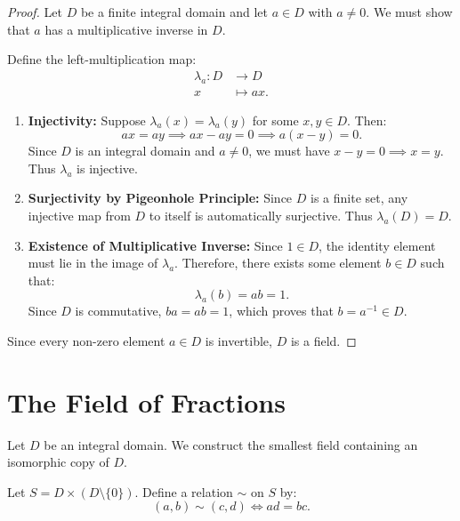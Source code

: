\begin{proof}
Let $D$ be a finite integral domain and let $a \in D$ with $a \ne 0$.
We must show that $a$ has a multiplicative inverse in $D$.

Define the left-multiplication map:
\begin{align*}
\lambda_a: D &\longrightarrow D \\
x &\longmapsto ax.
\end{align*}
\begin{enumerate}[label=\arabic*., leftmargin=*]
    \item \textbf{Injectivity:}
    Suppose $\lambda_a(x) = \lambda_a(y)$ for some $x, y \in D$. Then:
    \begin{equation*}
    ax = ay \implies ax - ay = 0 \implies a(x - y) = 0.
    \end{equation*}
    Since $D$ is an integral domain and $a \ne 0$, we must have $x - y = 0 \implies x = y$.
    Thus $\lambda_a$ is injective.

    \item \textbf{Surjectivity by Pigeonhole Principle:}
    Since $D$ is a finite set, any injective map from $D$ to itself is automatically surjective.
    Thus $\lambda_a(D) = D$.

    \item \textbf{Existence of Multiplicative Inverse:}
    Since $1 \in D$, the identity element must lie in the image of $\lambda_a$.
    Therefore, there exists some element $b \in D$ such that:
    \begin{equation*}
    \lambda_a(b) = ab = 1.
    \end{equation*}
    Since $D$ is commutative, $ba = ab = 1$, which proves that $b = a^{-1} \in D$.
\end{enumerate}
Since every non-zero element $a \in D$ is invertible, $D$ is a field.
\end{proof}

\section{The Field of Fractions}
\label{sec:field_of_fractions}

Let $D$ be an integral domain. We construct the smallest field containing an isomorphic copy of $D$.

\begin{definition}
Let $S = D \times (D \setminus \{0\})$. Define a relation $\sim$ on $S$ by:
\begin{equation}
(a, b) \sim (c, d) \iff ad = bc.
\end{equation}
\end{definition}


